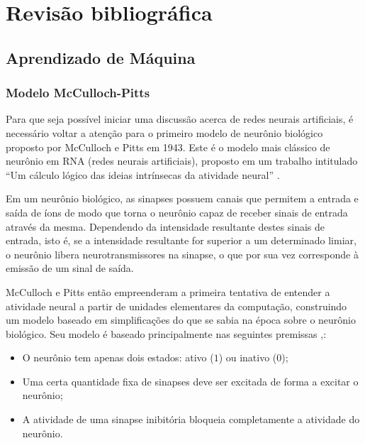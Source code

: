 \chapter{Revisão bibliográfica}

\section{Aprendizado de Máquina }

\subsection{Modelo McCulloch-Pitts}
Para que seja possível iniciar uma discussão acerca de redes neurais artificiais, é necessário voltar a atenção para o primeiro modelo de neurônio biológico proposto por McCulloch e Pitts em 1943. Este é o modelo mais clássico de neurônio em RNA (redes neurais artificiais), proposto em um trabalho intitulado ``Um cálculo lógico das ideias intrínsecas da atividade neural'' \cite{zuben_attux}.

Em um neurônio biológico, as sinapses possuem canais que permitem a entrada e saída de íons de modo que torna o neurônio capaz de receber sinais de entrada através da mesma. Dependendo da intensidade resultante destes sinais de entrada, isto é, se a intensidade resultante for superior a um determinado limiar, o neurônio libera neurotransmissores na sinapse, o que por sua vez corresponde à emissão de um sinal de saída.

McCulloch e Pitts então empreenderam a primeira tentativa de entender a atividade neural a partir de unidades elementares  da computação, construindo um modelo baseado em simplificações do que se sabia na época sobre o neurônio biológico. Seu modelo é baseado principalmente nas seguintes premissas \cite{zuben_attux},\cite{jacson}:

\begin{itemize}
\item O neurônio tem apenas dois estados: ativo ($1$) ou inativo ($0$);
\item Uma certa quantidade fixa de sinapses deve ser excitada de forma a excitar o neurônio;
\item A atividade de uma sinapse inibitória bloqueia completamente a atividade do neurônio.
\end{itemize}

